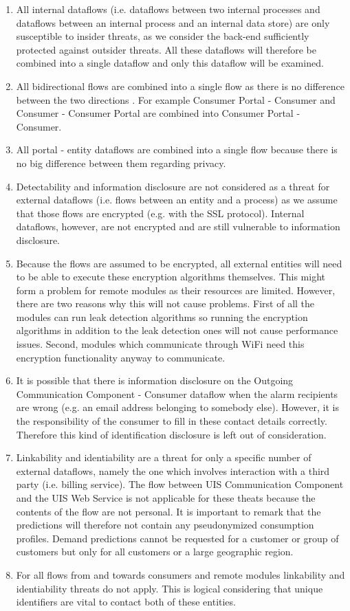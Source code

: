 \begin{enumerate}
  \item All internal dataflows (i.e. dataflows between two internal processes
  and dataflows between an internal process and an internal data store) are only
  susceptible to insider threats, as we consider the back-end sufficiently
  protected against outsider threats. All these dataflows will therefore be
  combined into a single dataflow and only this dataflow will be examined.
  \item All bidirectional flows are combined into a single flow as there is no
  difference between the two directions . For example Consumer Portal - Consumer
  and Consumer - Consumer Portal are combined into Consumer Portal - Consumer.
  \item All portal - entity dataflows are combined into a single flow because
  there is no big difference between them regarding privacy.
  \item Detectability and information disclosure are not considered as a threat
  for external dataflows (i.e. flows between an entity and a process) as we
  assume that those flows are encrypted (e.g. with the SSL protocol). Internal
  dataflows, however, are not encrypted and are still vulnerable to information
  disclosure.
  \item Because the flows are assumed to be encrypted, all external entities
  will need to be able to execute these encryption algorithms themselves. This
  might form a problem for remote modules as their resources are limited.
  However, there are two reasons why this will not cause problems. First of all
  the modules can run leak detection algorithms so running the encryption
  algorithms in addition to the leak detection ones will not cause performance
  issues. Second, modules which communicate through WiFi need this encryption
  functionality anyway to communicate.
  \item It is possible that there is information disclosure on the Outgoing
  Communication Component - Consumer dataflow when the alarm recipients are
  wrong (e.g. an email address belonging to somebody else). However, it is the
  responsibility of the consumer to fill in these contact details correctly.
  Therefore this kind of identification disclosure is left out of
  consideration.
  \item Linkability and identiability are a threat for only a specific
  number of external dataflows, namely the one which involves interaction with a
  third party (i.e. billing service). The flow between UIS Communication
  Component and the UIS Web Service is not applicable for these theats
  because the contents of the flow are not personal. It is important to remark
  that the predictions will therefore not contain any pseudonymized consumption
  profiles. Demand predictions cannot be requested for a customer or group of
  customers but only for all customers or a large geographic region.  
  \item For all flows from and towards consumers and remote modules linkability
  and identiability threats do not apply. This is logical considering that
  unique identifiers are vital to contact both of these entities.


\end{enumerate}
